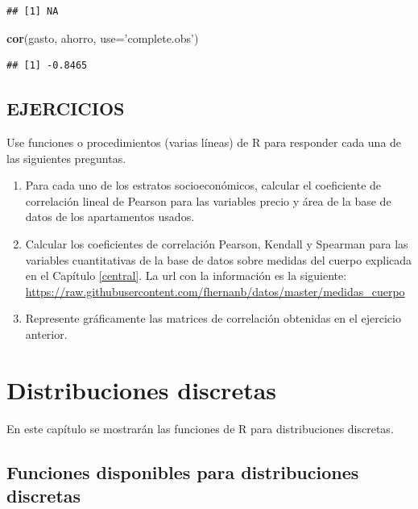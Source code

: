 \documentclass[10pt,]{krantz}
\makeatletter
\newenvironment{Shaded}{\begin{snugshade}}{\end{snugshade}}
\newcommand{\KeywordTok}[1]{\textcolor[rgb]{0.13,0.29,0.53}{\textbf{{#1}}}}
\newcommand{\DataTypeTok}[1]{\textcolor[rgb]{0.13,0.29,0.53}{{#1}}}
\newcommand{\StringTok}[1]{\textcolor[rgb]{0.31,0.60,0.02}{{#1}}}
\newcommand{\NormalTok}[1]{{#1}}
\let\proglang=\textsf
\newenvironment{kframe}{%
\medskip{}
\setlength{\fboxsep}{.8em}
 \def\at@end@of@kframe{}%
 \ifinner\ifhmode%
  \def\at@end@of@kframe{\end{minipage}}%
  \begin{minipage}{\columnwidth}%
 \fi\fi%
 \def\FrameCommand##1{\hskip\@totalleftmargin \hskip-\fboxsep
 \colorbox{shadecolor}{##1}\hskip-\fboxsep
     \hskip-\linewidth \hskip-\@totalleftmargin \hskip\columnwidth}%
 \MakeFramed {\advance\hsize-\width
   \@totalleftmargin\z@ \linewidth\hsize
   \@setminipage}}%
 {\par\unskip\endMakeFramed%
 \at@end@of@kframe}
\renewenvironment{Shaded}{\begin{kframe}}{\end{kframe}}
\makeatother
\begin{document}
\begin{verbatim}
## [1] NA
\end{verbatim}

\begin{Shaded}
\begin{Highlighting}[]
\KeywordTok{cor}\NormalTok{(gasto, ahorro, }\DataTypeTok{use=}\StringTok{'complete.obs'}\NormalTok{)}
\end{Highlighting}
\end{Shaded}

\begin{verbatim}
## [1] -0.8465
\end{verbatim}

\section*{EJERCICIOS}\label{ejercicios-5}


Use funciones o procedimientos (varias líneas) de \proglang{R} para
responder cada una de las siguientes preguntas.

\begin{enumerate}
\def\labelenumi{\arabic{enumi}.}
\item
  Para cada uno de los estratos socioeconómicos, calcular el coeficiente
  de correlación lineal de Pearson para las variables precio y área de
  la base de datos de los apartamentos usados.
\item
  Calcular los coeficientes de correlación Pearson, Kendall y Spearman
  para las variables cuantitativas de la base de datos sobre medidas del
  cuerpo explicada en el Capítulo \ref{central}. La url con la
  información es la siguiente:
  \url{https://raw.githubusercontent.com/fhernanb/datos/master/medidas_cuerpo}
\item
  Represente gráficamente las matrices de correlación obtenidas en el
  ejercicio anterior.
\end{enumerate}

\chapter{Distribuciones discretas}\label{distribuciones-discretas}

En este capítulo se mostrarán las funciones de \proglang{R} para
distribuciones discretas.

\section{\texorpdfstring{Funciones disponibles para distribuciones
discretas
}{Funciones disponibles para distribuciones discretas }}\label{funciones-disponibles-para-distribuciones-discretas}
\end{document}

